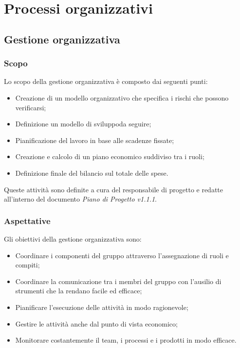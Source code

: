 %
\section{Processi organizzativi}
	\subsection{Gestione organizzativa}
		\subsubsection{Scopo}
			Lo scopo della gestione organizzativa è composto dai seguenti punti:
			\begin{itemize}
				\item Creazione di un modello organizzativo che specifica i rischi che possono verificarsi;
				\item Definizione un modello di sviluppo\glosp da seguire;
				\item Pianificazione del lavoro in base alle scadenze fissate;
				\item Creazione e calcolo di un piano economico suddiviso tra i ruoli;
				\item Definizione finale del bilancio sul totale delle spese.
			\end{itemize}
			Queste attività sono definite a cura del responsabile di progetto e redatte all'interno del documento \textit{Piano di Progetto v1.1.1}.
		\subsubsection{Aspettative}
			Gli obiettivi della gestione organizzativa sono:
			\begin{itemize}
				\item Coordinare i componenti del gruppo attraverso l'assegnazione di ruoli e compiti;
				\item Coordinare la comunicazione tra i membri del gruppo con l'ausilio di strumenti che la rendano facile ed efficace;
				\item Pianificare l'esecuzione delle attività in modo ragionevole;
				\item Gestire le attività anche dal punto di vista economico;
				\item Monitorare costantemente il team, i processi e i prodotti in modo efficace.
			\end{itemize}
